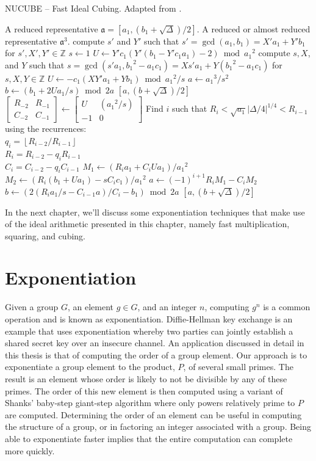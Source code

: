 \documentclass{ucalgthes1}
\theoremstyle{plain}
\theoremstyle{definition}
\newcommand{\ZZ}{\mathbb{Z}}
\newcommand{\matrixtt}[4]{\left[ \begin{array}{rr} #1 & #2 \\ #3 & #4 \end{array} \right]}
\newcommand{\floor}[1]{\left\lfloor #1 \right\rfloor}
\begin{document}
\begin{algorithm}[h]
\caption{NUCUBE -- Fast Ideal Cubing. Adapted from \cite[p.26]{Imbert2010}.}
\label{alg:nucube}
\begin{algorithmic}[1]
\REQUIRE A reduced representative $\mathfrak a = [a_1, (b_1+\sqrt\Delta)/2]$.
\ENSURE A reduced or almost reduced representative $\mathfrak a^3$.
\STATE compute $s'$ and $Y'$ such that $s' = \gcd(a_1, b_1) = X'a_1 + Y'b_1$ for $s', X', Y' \in \ZZ$
	\STATE $s \gets 1$
	\STATE $U \gets Y'c_1(Y'(b_1 - Y'c_1a_1) - 2) \bmod {a_1}^2$
\ELSE
	\STATE compute $s, X$, and $Y$ such that $s = \gcd(s'a_1, {b_1}^2 - a_1c_1) = Xs'a_1 + Y({b_1}^2 - a_1c_1)$ for $s, X, Y \in \ZZ$
	\STATE $U \gets -c_1(XY'a_1+Yb_1) \bmod {a_1}^2/s$
\ENDIF
{}
	\STATE $a \gets {a_1}^3/s^2$
	\STATE $b \gets (b_1 + 2Ua_1/s) \bmod 2a$
	\RETURN $[a, (b+\sqrt\Delta)/2]$
\ENDIF
\STATE $\matrixtt{R_{-2}}{R_{-1}}{C_{-2}}{C_{-1}} \gets \matrixtt{U}{({a_1}^2/s)}{-1}{0}$
\STATE Find $i$ such that $R_i < \sqrt{a_1} |\Delta/4|^{1/4} < R_{i-1}$ using the recurrences: \\
       $q_i = \floor{R_{i-2}/R_{i-1}}$ \\
       $R_i = R_{i-2}-q_i R_{i-1}$ \\
       $C_i=C_{i-2}-q_i C_{i-1}$
\STATE $M_1 \gets (R_ia_1 + C_iUa_1) / {a_1}^2$
\STATE $M_2 \gets (R_i(b_1 + Ua_1) - sC_ic_1) / {a_1}^2$
\STATE $a \gets (-1)^{i+1} R_i M_1 - C_i M_2$
\STATE $b \gets (2(R_ia_1/s - C_{i-1}a)/C_i - b_1) \bmod 2a$
\RETURN $[a, (b+\sqrt\Delta)/2]$
\end{algorithmic}
\end{algorithm}

In the next chapter, we'll discuss some exponentiation techniques that make use of the ideal arithmetic presented in this chapter, namely fast multiplication, squaring, and cubing.


\chapter{Exponentiation}
\label{chap:exponentiation}

Given a group $G$, an element $g \in G$, and an integer $n$, computing $g^n$ is a common operation and is known as exponentiation.  Diffie-Hellman key exchange is an example that uses exponentiation whereby two parties can jointly establish a shared secret key over an insecure channel.  An application discussed in detail in this thesis is that of computing the order of a group element.  Our approach is to exponentiate a group element to the product, $P$, of several small primes.  The result is an element whose order is likely to not be divisible by any of these primes. The order of this new element is then computed using a variant of Shanks' baby-step giant-step algorithm where only powers relatively prime to $P$ are computed.  Determining the order of an element can be useful in computing the structure of a group, or in factoring an integer associated with a group.  Being able to exponentiate faster implies that the entire computation can complete more quickly.
\end{document}

